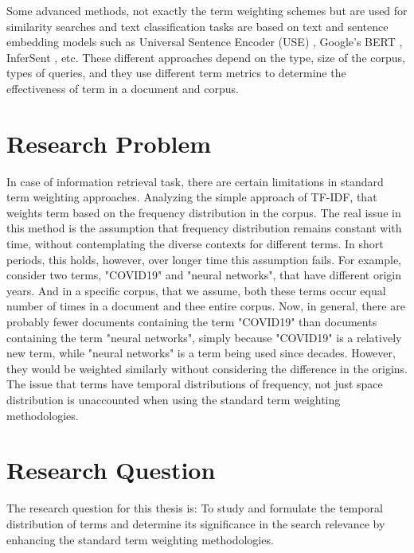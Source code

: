 	Some advanced methods, not exactly the term weighting schemes but are used for similarity searches and text classification tasks are based on text and sentence embedding models such as Universal Sentence Encoder (USE) \cite{RN32}, Google’s BERT  \cite{DBLP:journals/corr/abs-1810-04805}, InferSent \cite{DBLP:journals/corr/ConneauKSBB17}, etc. These different approaches depend on the type, size of the corpus, types of queries, and they use different term metrics to determine the effectiveness of term in a document and corpus.
	
	\section{Research Problem}
	In case of information retrieval task, there are certain limitations in standard term weighting approaches. Analyzing the simple approach of TF-IDF, that weights term based on the frequency distribution in the corpus. The real issue in this method is the assumption that frequency distribution remains constant with time, without contemplating the diverse contexts for different terms. In short periods, this holds, however, over longer time this assumption fails. For example, consider two terms, "COVID19" and "neural networks", that have different origin years. And in a specific corpus, that we assume, both these terms occur equal number of times in a document and thee entire corpus. Now, in general, there are probably fewer documents containing the term "COVID19" than documents containing the term "neural networks", simply because "COVID19" is a relatively new term, while "neural networks" is a term being used since decades. However, they would be weighted similarly without considering the difference in the origins. The issue that terms have temporal distributions of frequency, not just space distribution is unaccounted when using the standard term weighting methodologies.

    \section{Research Question}
	The research question for this thesis is:
	To study and formulate the temporal distribution of terms and 
	determine its significance in the search relevance by enhancing the standard term weighting methodologies.
	
